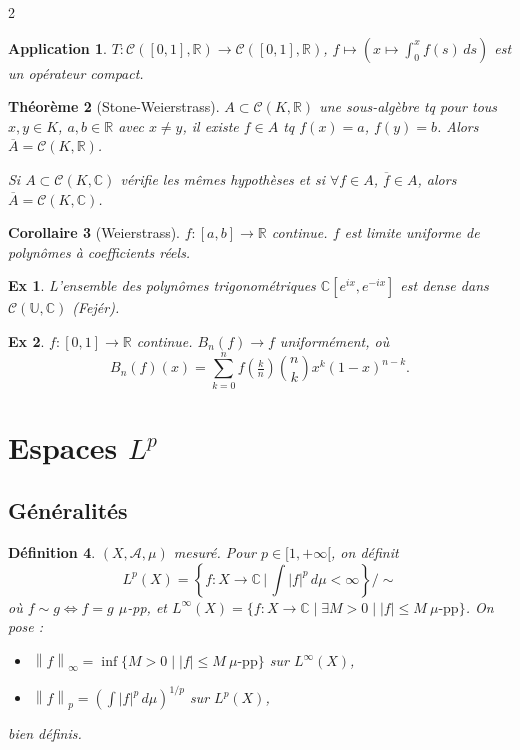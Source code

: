 \documentclass[10pt,a4paper]{article}
\theoremstyle{plan}
\newtheorem{theoreme}{Théorème}
\newtheorem{definition}[theoreme]{Définition}
\newtheorem{corollaire}[theoreme]{Corollaire}
\newtheorem{application}[theoreme]{Application}
\theoremstyle{planex}   %
\newtheorem*{exemple*}{Ex}
\newcommand{\R}{\mathbb{R}}
\newcommand{\C}{\mathbb{C}}
\newcommand{\U}{\mathbb{U}}
\newcommand{\Cc}{\mathcal{C}}
\newcommand{\tribu}{\mathcal{A}}
\newcommand{\norm}[1]{\left\lVert #1\right\rVert}
\newcommand{\abs}[1]{\left\lvert #1\right\rvert}
\newcommand{\Lp}[1][p]{L^{#1}}
\begin{document}
\begin{multicols}{2}
\begin{application}
$T : \Cc([0,1],\R) \to \Cc([0,1],\R)$, $f \mapsto \left( x \mapsto \int_0^x f(s)\,ds \right)$ est un opérateur compact.
\end{application}

\begin{theoreme}[Stone-Weierstrass] %
$A \subset \Cc(K,\R)$ une sous-algèbre tq pour tous $x, y \in K$, $a, b \in \R$ avec $x \ne y$, il existe $f \in A$ tq $f(x) = a$, $f(y) = b$. Alors $\overline{A} = \Cc(K,\R)$.

Si $A \subset \Cc(K,\C)$ vérifie les mêmes hypothèses et si $\forall f \in A$, $\overline{f} \in A$, alors $\overline{A} = \Cc(K,\C)$.
\end{theoreme}

\begin{corollaire}[Weierstrass]
$f : [a,b] \to \R$ continue. $f$ est limite uniforme de polynômes à coefficients réels.
\end{corollaire}

\begin{exemple*}
L'ensemble des polynômes trigonométriques $\C[e^{ix}, e^{-ix}]$ est dense dans $\Cc(\U,\C)$ (Fejér).
\end{exemple*}

\begin{exemple*}
$f : [0,1] \to \R$ continue. $B_n(f) \to f$ uniformément, où
\[ B_n(f)(x) = \sum_{k=0}^{n} f\!\left(\tfrac{k}{n}\right) \binom{n}{k} x^k (1-x)^{n-k}. \]
\end{exemple*}

\section{Espaces $\Lp$}

\subsection{Généralités}

\begin{definition}
$(X, \tribu, \mu)$ mesuré. Pour $p \in [1,+\infty[$, on définit
\[ \Lp(X) = \left\{ f : X \to \C \,\Big|\, \int \abs{f}^p\,d\mu < \infty \right\} \Big/ \sim \]
où $f \sim g \Leftrightarrow f = g$ $\mu$-pp,
et $\Lp[\infty](X) = \{ f : X \to \C \mid \exists M > 0 \mid \abs{f} \le M\ \mu\text{-pp} \}$. On pose :
\begin{itemize}
\item $\norm{f}_\infty = \inf \{ M > 0 \mid \abs{f} \le M\ \mu\text{-pp} \}$ sur $\Lp[\infty](X)$,
\item $\norm{f}_p = \left( \int \abs{f}^p\,d\mu \right)^{1/p}$ sur $\Lp(X)$,
\end{itemize}
bien définis.
\end{definition}


\end{multicols}
\end{document}
